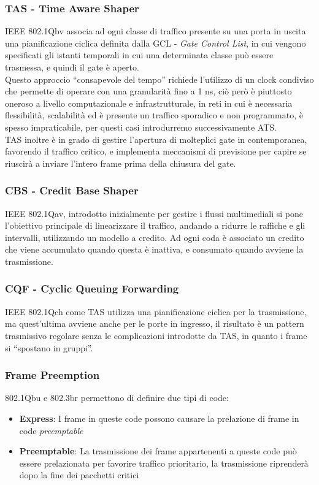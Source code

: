 \documentclass[12pt,a4paper,twoside]{book}
\begin{document}
\begin{onehalfspace}
\subsubsection{TAS - Time Aware Shaper}
IEEE 802.1Qbv associa ad ogni classe di traffico presente su una porta in uscita una pianificazione ciclica definita dalla GCL - \textit{Gate Control List}, in cui vengono specificati gli istanti temporali in cui una determinata classe può essere trasmessa, e quindi il gate è aperto.
\\
Questo approccio “consapevole del tempo” richiede l'utilizzo di un clock condiviso che permette di operare con una granularità fino a 1 ns, ciò però è piuttosto oneroso a livello computazionale e infrastrutturale, in reti in cui è necessaria flessibilità, scalabilità ed è presente un traffico sporadico e non programmato, è spesso impraticabile, per questi casi introdurremo successivamente ATS. 
\\
TAS inoltre è in grado di gestire l'apertura di molteplici gate in contemporanea, favorendo il traffico critico, e implementa meccanismi di previsione per capire se riuscirà a inviare l'intero frame prima della chiusura del gate.
\subsubsection{CBS - Credit Base Shaper}
IEEE 802.1Qav, introdotto inizialmente per gestire i flussi multimediali si pone l'obiettivo principale di linearizzare il traffico, andando a ridurre le raffiche e gli intervalli, utilizzando un modello a credito.
Ad ogni coda è associato un credito che viene accumulato quando questa è inattiva, e consumato quando avviene la trasmissione.
\subsubsection{CQF - Cyclic Queuing Forwarding} 
IEEE 802.1Qch come TAS utilizza una pianificazione ciclica per la trasmissione, ma quest'ultima avviene anche per le porte in ingresso, il risultato è un pattern trasmissivo regolare senza le complicazioni introdotte da TAS, in quanto i frame si “spostano in gruppi”.
\subsubsection{Frame Preemption}
\label{subsec:frame_prempt}
802.1Qbu e 802.3br permettono di definire due tipi di code:
\begin{itemize}
    \item \textbf{Express}: I frame in queste code possono causare la prelazione di frame in code \textit{preemptable}
    \item \textbf{Preemptable}: La trasmissione dei frame appartenenti a queste code può essere prelazionata per favorire traffico prioritario, la trasmissione riprenderà dopo la fine dei pacchetti critici
\end{itemize}


\end{onehalfspace}
\end{document}
